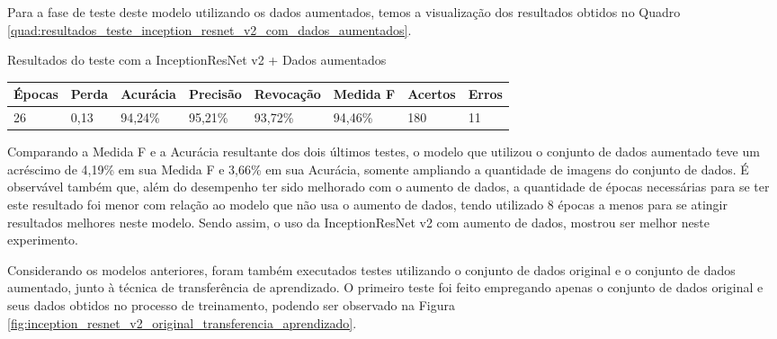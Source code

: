 \documentclass[
	12pt,				%
	oneside,			%
	a4paper,			%
	english,			%
	brazil				%
	]{abntex2ppgsi}
\begin{document}
Para a fase de teste deste modelo utilizando os dados aumentados, temos a visualização dos resultados obtidos no Quadro \ref{quad:resultados_teste_inception_resnet_v2_com_dados_aumentados}.

\begin{quadro}[H]
\caption{Resultados do teste com a InceptionResNet v2 + Dados aumentados}
\label{quad:resultados_teste_inception_resnet_v2_com_dados_aumentados}
\centering
\begin{tabular}{|l|l|l|l|l|l|l|l|}
\cline{1-8}
Épocas & Perda & Acurácia & Precisão & Revocação & Medida F & Acertos & Erros \\ \hline
26 & 0,13 & 94,24\% & 95,21\% & 93,72\% & 94,46\% & 180 & 11 \\
\cline{1-8}
\end{tabular}
\end{quadro}

Comparando a Medida F e a Acurácia resultante dos dois últimos testes, o modelo que utilizou o conjunto de dados aumentado teve um acréscimo de 4,19\% em sua Medida F e 3,66\% em sua Acurácia, somente ampliando a quantidade de imagens do conjunto de dados. É observável também que, além do desempenho ter sido melhorado com o aumento de dados, a quantidade de épocas necessárias para se ter este resultado foi menor com relação ao modelo que não usa o aumento de dados, tendo utilizado 8 épocas a menos para se atingir resultados melhores neste modelo. Sendo assim, o uso da InceptionResNet v2 com aumento de dados, mostrou ser melhor neste experimento.

Considerando os modelos anteriores, foram também executados testes utilizando o conjunto de dados original e o conjunto de dados aumentado, junto à técnica de transferência de aprendizado. O primeiro teste foi feito empregando apenas o conjunto de dados original e seus dados obtidos no processo de treinamento, podendo ser observado na Figura \ref{fig:inception_resnet_v2_original_transferencia_aprendizado}.
\end{document}

